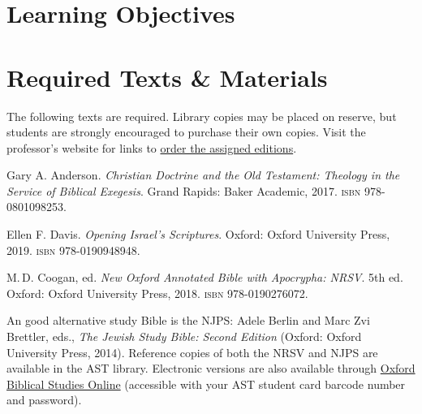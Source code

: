 \documentclass[titlepage]{article}
\newcommand\incl{../includes}
\begin{document}


\section{Learning Objectives}
\label{objectives}
\edobject

\section{Required Texts \& Materials}
\label{texts}

The following texts are required. Library copies may be placed on reserve, but students are strongly encouraged to purchase their own copies. Visit the professor's website for links to
\href{https://danieldriver.com/courses/hbst-3001/}{order the assigned editions}.

\begingroup
\renewcommand{\section}[2]{}%
\begin{thebibliography}{Anderson}%

	 Gary A. Anderson.
	\emph{Christian Doctrine and the Old Testament: Theology in the Service of Biblical Exegesis}.
	Grand Rapids: Baker Academic, 2017.
	\textsc{isbn} 978-0801098253.

	 Ellen F. Davis.
	\emph{Opening Israel’s Scriptures}.
	Oxford: Oxford University Press, 2019.
	\textsc{isbn} 978-0190948948.

	 M.\,D. Coogan, ed.
	\emph{New Oxford Annotated Bible with Apocrypha: NRSV}. 5th ed.
	Oxford: Oxford University Press, 2018.
	\textsc{isbn} 978-0190276072.

%


\end{thebibliography}
\endgroup

An good alternative study Bible is the NJPS: Adele Berlin and Marc Zvi
Brettler, eds., \emph{The Jewish Study Bible: Second Edition} (Oxford:
Oxford University Press, 2014). Reference copies of both the NRSV and
NJPS are available in the AST library. Electronic versions are also
available through
\href{http://ezproxy.astheology.ns.ca:2048/login?url=http://www.oxfordbiblicalstudies.com/}{Oxford Biblical Studies Online} (accessible with your AST student card barcode number and password).
\end{document}
